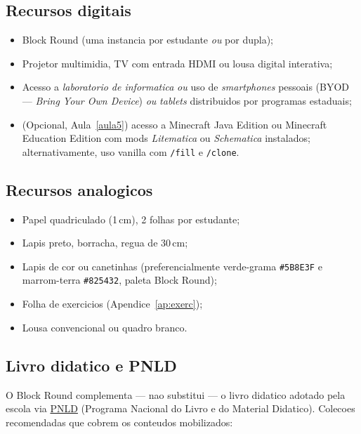 \documentclass[12pt,a4paper]{scrartcl}
\newcommand{\cmd}[1]{\textcolor{earth}{\texttt{\small #1}}}
\begin{document}
\subsection{Recursos digitais}
\begin{itemize}[leftmargin=1.3em,itemsep=0.15em,topsep=0.3em]
  \item Block Round (uma instancia por estudante \emph{ou} por dupla);
  \item Projetor multimidia, TV com entrada HDMI ou lousa digital interativa;
  \item Acesso a \emph{laboratorio de informatica} \emph{ou} uso de \emph{smartphones} pessoais (BYOD --- \emph{Bring Your Own Device}) \emph{ou} \emph{tablets} distribuidos por programas estaduais;
  \item (Opcional, Aula~\ref{aula5}) acesso a Minecraft Java Edition ou Minecraft Education Edition com mods \emph{Litematica} ou \emph{Schematica} instalados; alternativamente, uso vanilla com \cmd{/fill} e \cmd{/clone}.
\end{itemize}

\subsection{Recursos analogicos}
\begin{itemize}[leftmargin=1.3em,itemsep=0.15em,topsep=0.3em]
  \item Papel quadriculado (1\,cm), 2 folhas por estudante;
  \item Lapis preto, borracha, regua de 30\,cm;
  \item Lapis de cor ou canetinhas (preferencialmente verde-grama \texttt{\#5B8E3F} e marrom-terra \texttt{\#825432}, paleta Block Round);
  \item Folha de exercicios (Apendice~\ref{ap:exerc});
  \item Lousa convencional ou quadro branco.
\end{itemize}

\subsection{Livro didatico e PNLD}\label{sec:pnld}

O Block Round complementa --- nao substitui --- o livro didatico adotado pela escola via \href{https://www.gov.br/fnde/pt-br/acesso-a-informacao/acoes-e-programas/programas/programas-do-livro}{PNLD} (Programa Nacional do Livro e do Material Didatico). Colecoes recomendadas que cobrem os conteudos mobilizados:
\end{document}
